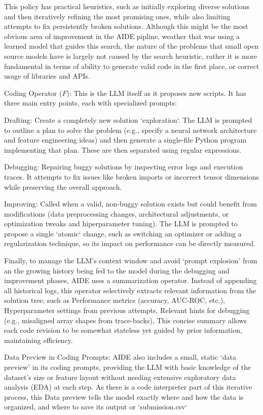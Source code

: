 This policy has practical heuristics, such as initially exploring diverse solutions and then iteratively refining the most promising ones, while also limiting attempts to fix persistently broken solutions. Although this might be the most obvious area of improvement in the AIDE pipline, weather that was using a learned model that guides this search, the nature of the problems that small open source models have is largely not caused by the search heuristic, rather it is more fundamental in terms of ability to generate valid code in the first place, or correct usage of libraries and APIs.

Coding Operator ($F$): This is the LLM itself as it proposes new scripts. It has three main entry points, each with specialized prompts:

Drafting: Create a completely new solution `exploration`. The LLM is prompted to outline a plan to solve the problem (e.g., specify a neural network architecture and feature engineering ideas) and then generate a single-file Python program implementing that plan. These are then separated using regular expressions.

Debugging: Repairing buggy solutions by inspecting error logs and execution traces. It attempts to fix issues like broken imports or incorrect tensor dimensions while preserving the overall approach.

Improving: Called when a valid, non-buggy solution exists but could benefit from modifications (data preprocessing changes, architectural adjustments, or optimization tweaks and hiperparameter tuning). The LLM is prompted to propose a single `atomic` change, such as switching an optimizer or adding a regularization technique, so its impact on performance can be directly measured.

Finally, to manage the LLM's context window and avoid `prompt explosion' from an  the growing history being fed to the model during the debugging and improvement phases, AIDE uses a summarization operator. Instead of appending all historical logs, this operator selectively extracts relevant information from the solution tree, such as Performance metrics (accuracy, AUC-ROC, etc.), Hyperparameter settings from previous attempts, Relevant hints for debugging (e.g., misaligned array shapes from trace-backs), This concise summary allows each code revision to be somewhat stateless yet guided by prior information, maintaining efficiency.

Data Preview in Coding Prompts: AIDE also includes a small, static `data preview' in its coding prompts, providing the LLM with basic knowledge of the dataset's size or feature layout without needing extensive exploratory data analysis (EDA) at each step. As there is a code interpreter part of this iterative process, this Data preview tells the model exactly where and how the data is organized, and where to save its output or `submission.csv`

